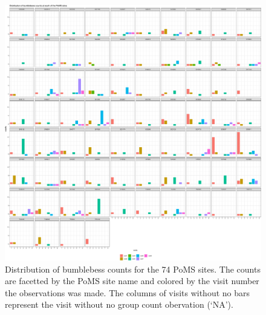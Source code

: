 \documentclass[
]{article}
\begin{document}
\begin{figure}

{\centering \includegraphics{SupplementaryInformationOne_files/figure-pdf/fig-bbGCPlot-1.pdf}

}

\caption{\label{fig-bbGCPlot}Distribution of bumblebess counts for the
74 PoMS sites. The counts are facetted by the PoMS site name and colored
by the visit number the observations was made. The columns of visits
without no bars represent the visit without no group count obervation
(`NA').}

\end{figure}
\end{document}
